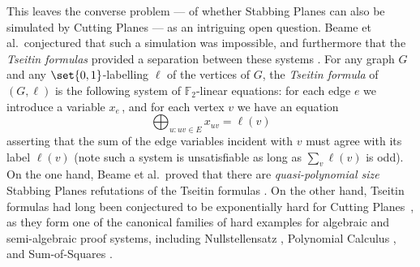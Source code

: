 This leaves the converse problem --- of whether Stabbing Planes can also be simulated by Cutting Planes --- as an intriguing open question.
Beame et al.~conjectured that such a simulation was impossible, and furthermore that the \emph{Tseitin formulas} provided a separation between these systems \cite{BeameFIKPPR18}.
For any graph $G$ and any $\set{0,1}$-labelling $\ell$ of the vertices of $G$, the \emph{Tseitin formula} of $(G, \ell)$ is the following system of $\mathbb{F}_2$-linear equations: for each edge $e$ we introduce a variable $x_e\,$, and for each vertex $v$ we have an equation
\[ \bigoplus_{u: uv \in E} x_{uv} = \ell(v)\]
asserting that the sum of the edge variables incident with $v$ must agree with its label $\ell(v)$ (note such a system is unsatisfiable as long as $\sum_v \ell(v)$ is odd).
On the one hand, Beame et al.~proved that there are \emph{quasi-polynomial size} Stabbing Planes refutations of the Tseitin formulas \cite{BeameFIKPPR18}.
On the other hand, Tseitin formulas had long been conjectured to be exponentially hard for Cutting Planes~\cite{CookCT87}, as they form one of the canonical families of hard examples for algebraic and semi-algebraic proof systems, including Nullstellensatz \cite{dima-nsatz}, Polynomial Calculus \cite{bgip}, and Sum-of-Squares \cite{dima-sos,Schoenebeck08}. 



